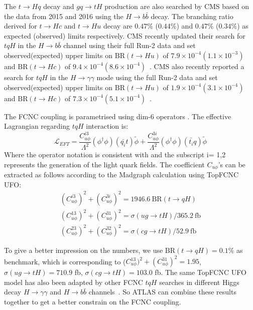 The $t\to Hq$ decay and $gq\to tH$ production are also searched by CMS based on the data from 2015 and 2016\cite{CMS-TOP-17-003} using the $H\to b\bar{b}$ decay. The branching ratio derived for $t\to Hc$ and $t\to Hu$ decay are $0.47\%$ ($0.44\%$) and $0.47\%$ ($0.34\%$) as expected (observed) limits respectively. CMS recently updated their search for $tqH$ in the $H\to b\bar{b}$ channel using
their full Run-2 data and  set observed(expected) upper limits on $\text{BR}(t\to Hu)$ of $7.9\times10^{-4}(1.1\times10^{-3})$ and $\text{BR}(t\to Hc)$ of $9.4\times10^{-4}(8.6\times10^{-4})$~\cite{CMS-PAS-TOP-19-002}.
CMS also recently reported a search for $tqH$ in the $H\rightarrow \gamma\gamma$ mode using the full Run-2 data and set observed(expected) upper limits on $\text{BR}(t\to Hu)$ of $1.9\times10^{-4}(3.1\times10^{-4})$ and $\text{BR}(t\to Hc)$ of $7.3\times10^{-4}(5.1\times10^{-4})$~\cite{CMS-PAS-TOP-20-007}.

The FCNC coupling is parametrised using dim-6 operators \cite{fcnc_production_theory}. The effective Lagrangian regarding $tqH$ interaction is:
%
\begin{equation}
\mathcal{L}_{EFT} = \frac{C^{i3}_{u\phi}}{\Lambda^{2}}(\phi^{\dagger}\phi)(\bar{q_{i}}t)\tilde{\phi} + \frac{C^{3i}_{u\phi}}{\Lambda^{2}}(\phi^{\dagger}\phi)(\bar{t_{i}}q)\tilde{\phi}
\label{eq:eq01}
\end{equation}
%
Where the operator notation is consistent with \cite{fcnc_production_theory} and the subscript i= 1,2 represents the generation of the light quark fields. 
The coefficient $C_{u\phi}$'s can be extracted as follows according to the Madgraph calculation using TopFCNC UFO:
\begin{equation}
\begin{array}{l}
(C^{i3}_{u\phi})^2 + (C^{3i}_{u\phi})^2 = 1946.6~\text{BR}(t\to qH)\\
(C^{13}_{u\phi})^2 + (C^{31}_{u\phi})^2 = \sigma(ug\to tH)/365.2~\text{fb}\\
(C^{23}_{u\phi})^2 + (C^{32}_{u\phi})^2 = \sigma(cg\to tH)/52.9~\text{fb}
\end{array}
\label{eq:eq02}
\end{equation}

To give a better impression on the numbers, we use $\text{BR}(t\to qH)=0.1\%$ as benchmark, which is corresponding to ($C^{13}_{u\phi})^2 + (C^{31}_{u\phi})^2=1.95$, $\sigma(ug\to tH)=710.9$ fb, $\sigma(cg\to tH)=103.0$ fb. The same TopFCNC UFO model has also been adapted by other FCNC $tqH$ searches in different Higgs decay $H\rightarrow\gamma\gamma$ and $H\rightarrow b\bar b$
channels~\cite{tqHgammagamma,tqHbb}. So ATLAS can combine these results together to get a better constrain on the FCNC coupling.  

